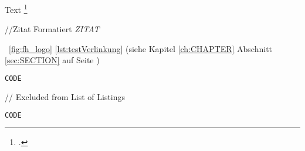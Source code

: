 \textit{}           %
\textbf{} \newline  %
\glqq Text\grqq{}   %
\quotations{}       %
\catchphrase{}      %
\autocite { Toussaint 2013}                 %
\autocite [17]{ Toussaint 2013}             %
\autocite [ vgl .][17]{ Toussaint 2013}     %
\autocite [ vgl .][]{ Toussaint 2013}       %
\cite { Toussaint 2013}                     %
\footcite { Toussaint 2013}                 %
\parencite *{ Toussaint 2013}               %

\begin{center}
    //Zitat Formatiert
    \textit{\glqq ZITAT \grqq{}}
\end{center}


~\ref{fig:fh_logo}
\ref{lst:testVerlinkung}
\pageref{fig:test}
(siehe Kapitel \ref{ch:CHAPTER} Abschnitt \ref{sec:SECTION} auf Seite \pageref{sec:SECTION})



\begin{lstlisting}[caption={REPLACECODE},label={lst:replaceCode}, language=kotlin]
CODE
\end{lstlisting}

// Excluded from List of Listings
\begin{lstlisting}[caption={REPLACECODE},nolol,label={lst:replaceCode}, language=kotlin]
CODE
\end{lstlisting}


